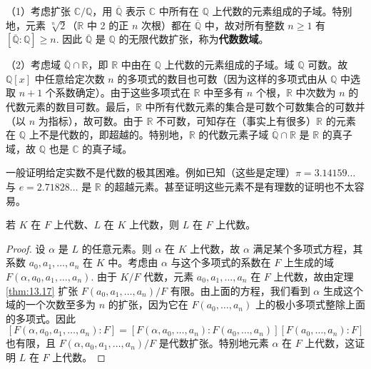 \begin{example}
（1）考虑扩张 \(\mathbb{C}/\mathbb{Q}\)，用 \(\overline{\mathbb{Q}}\) 表示 \(\mathbb{C}\) 中所有在 \(\mathbb{Q}\) 上代数的元素组成的子域。特别地，元素 \(\sqrt[n]{2}\)（\(\mathbb{R}\) 中 2 的正 \(n\) 次根）都在 \(\overline{\mathbb{Q}}\) 中，故对所有整数 \(n \geq 1\) 有 \([\overline{\mathbb{Q}}:\mathbb{Q}] \geq n\). 因此 \(\overline{\mathbb{Q}}\) 是 \(\mathbb{Q}\) 的无限代数扩张，称为\textbf{代数数域}。

（2）考虑域 \(\overline{\mathbb{Q}} \cap \mathbb{R}\)，即 \(\mathbb{R}\) 中由在 \(\mathbb{Q}\) 上代数的元素组成的子域。域 \(\mathbb{Q}\) 可数。故 \(\mathbb{Q}[x]\) 中任意给定次数 \(n\) 的多项式的数目也可数（因为这样的多项式由从 \(\mathbb{Q}\) 中选取 \(n+1\) 个系数确定）。由于这些多项式在 \(\mathbb{R}\) 中至多有 \(n\) 个根，\(\mathbb{R}\) 中次数为 \(n\) 的代数元素的数目可数。最后，\(\mathbb{R}\) 中所有代数元素的集合是可数个可数集合的可数并（以 \(n\) 为指标），故可数。由于 \(\mathbb{R}\) 不可数，可知存在（事实上有很多）\(\mathbb{R}\) 的元素在 \(\mathbb{Q}\) 上不是代数的，即超越的。特别地，\(\mathbb{R}\) 的代数元素子域 \(\overline{\mathbb{Q}} \cap \mathbb{R}\) 是 \(\mathbb{R}\) 的真子域，故 \(\mathbb{Q}\) 也是 \(\mathbb{C}\) 的真子域。
\end{example}

一般证明给定实数不是代数的极其困难。例如已知（这些是定理）\(\pi = 3.14159\ldots\) 与 \(e = 2.71828\ldots\) 是 \(\mathbb{R}\) 的超越元素。甚至证明这些元素不是有理数的证明也不太容易。

\begin{theorem}\label{thm:13.20}
若 \(K\) 在 \(F\) 上代数、\(L\) 在 \(K\) 上代数，则 \(L\) 在 \(F\) 上代数。
\end{theorem}

\begin{proof}
设 \(\alpha\) 是 \(L\) 的任意元素。则 \(\alpha\) 在 \(K\) 上代数，故 \(\alpha\) 满足某个多项式方程，其系数 \(a_0, a_1, \ldots, a_n\) 在 \(K\) 中。考虑由 \(\alpha\) 与这个多项式的系数在 \(F\) 上生成的域 \(F(\alpha, a_0, a_1, \ldots, a_n)\). 由于 \(K/F\) 代数，元素 \(a_0, a_1, \ldots, a_n\) 在 \(F\) 上代数，故由定理 \ref{thm:13.17} 扩张 \(F(a_0, a_1, \ldots, a_n)/F\) 有限。由上面的方程，我们看到 \(\alpha\) 生成这个域的一个次数至多为 \(n\) 的扩张，因为它在 \(F(a_0, \ldots, a_n)\) 上的极小多项式整除上面的多项式。因此
\[
[F(\alpha, a_0, a_1, \ldots, a_n):F] = [F(\alpha, a_0, \ldots, a_n):F(a_0, \ldots, a_n)][F(a_0, \ldots, a_n):F]
\]
也有限，且 \(F(\alpha, a_0, a_1, \ldots, a_n)/F\) 是代数扩张。特别地元素 \(\alpha\) 在 \(F\) 上代数，这证明 \(L\) 在 \(F\) 上代数。
\end{proof}

